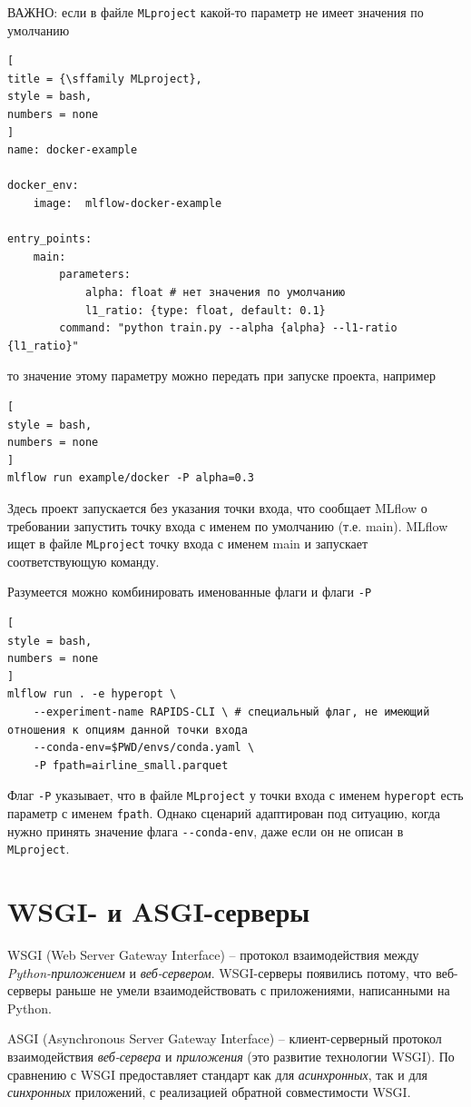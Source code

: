 \documentclass[%
	11pt,
	a4paper,
	utf8,
		]{article}
\begin{document}
ВАЖНО: если в файле \texttt{MLproject} какой-то параметр не имеет значения по умолчанию
\begin{lstlisting}[
title = {\sffamily MLproject},
style = bash,
numbers = none	
]
name: docker-example

docker_env:
	image:  mlflow-docker-example

entry_points:
	main:
		parameters:
			alpha: float # нет значения по умолчанию
			l1_ratio: {type: float, default: 0.1}
		command: "python train.py --alpha {alpha} --l1-ratio {l1_ratio}"
\end{lstlisting}
то значение этому параметру можно передать при запуске проекта, например
\begin{lstlisting}[
style = bash,
numbers = none	
]
mlflow run example/docker -P alpha=0.3
\end{lstlisting}

Здесь проект запускается без указания точки входа, что сообщает MLflow о требовании запустить точку входа с именем по умолчанию (т.е. main). MLflow ищет в файле \texttt{MLproject} точку входа с именем main и запускает соответствующую команду.

Разумеется можно комбинировать именованные флаги и флаги \verb|-P|
\begin{lstlisting}[
style = bash,
numbers = none
]
mlflow run . -e hyperopt \
    --experiment-name RAPIDS-CLI \ # специальный флаг, не имеющий отношения к опциям данной точки входа
    --conda-env=$PWD/envs/conda.yaml \
    -P fpath=airline_small.parquet
\end{lstlisting}

Флаг \verb|-P| указывает, что в файле \texttt{MLproject} у точки входа с именем \texttt{hyperopt} есть параметр с именем \texttt{fpath}. Однако сценарий адаптирован под ситуацию, когда нужно принять значение флага \verb|--conda-env|, даже если он не описан в \texttt{MLproject}.

\section{WSGI- и ASGI-серверы}

WSGI (Web Server Gateway Interface) -- протокол взаимодействия между \emph{Python-приложением} и \emph{веб-сервером}. WSGI-серверы появились потому, что веб-серверы раньше не умели взаимодействовать с приложениями, написанными на Python.

ASGI (Asynchronous Server Gateway Interface) -- клиент-серверный протокол взаимодействия \emph{веб-сервера} и \emph{приложения} (это развитие технологии WSGI). По сравнению с WSGI предоставляет стандарт как для \emph{асинхронных}, так и для \emph{синхронных} приложений, с реализацией обратной совместимости WSGI.
\end{document}
